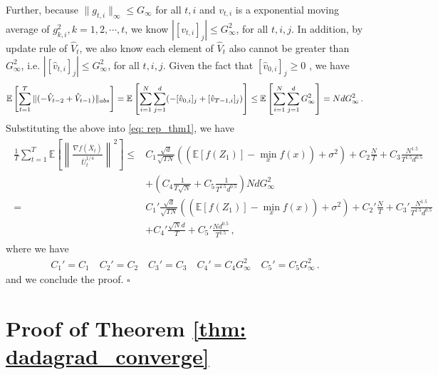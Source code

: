 \documentclass[11pt]{article}
\begin{document}
Further, because $\|g_{t,i}\|_{\infty} \leq G_{\infty}$ for all $t,i$ and $v_{t,i}$ is a exponential moving average of $g_{k,i}^2, k=1,2,\cdots,t$, we know $|[v_{t,i}]_j| \leq G^2_{\infty}$, for all $t,i,j$. In addition, by update rule of $\hat V_t$, we also know each element of $\hat V_{t}$ also cannot be greater than $G^2_{\infty}$, i.e. $|[\hat v_{t,i}]_j| \leq G^2_{\infty}$, for all $t,i,j$. 
Given the fact that $[\hat v_{0,i}]_j \geq 0$ , we have 
\begin{align}\notag
\mathbb E \left[ \sum_{t=1}^{T}   \|    (- \hat V_{t-2} + \hat V_{t-1} ) \|_{abs} \right]  = \mathbb E \left[   \sum_{i=1}^N \sum_{j=1}^d    (- [\hat v_{0,i}]_j + [\hat v_{T-1,i}]_j ) \right]  
\leq  \mathbb E \left[   \sum_{i=1}^N \sum_{j=1}^d  G_{\infty}^2   \right] =  Nd G_{\infty}^2 \, .
\end{align}
Substituting the above into \eqref{eq: rep_thm1}, we have 
\begin{align}\label{eq: sub_thm1}
\begin{split}
	 \frac{1}{T}\sum_{t=1}^T  \mathbb E \left [\left\|\frac{\nabla f( \overline X_{t})}{\overline U_{t}^{1/4}}\right\|^2  \right] 
	\leq  & C_1 \frac{\sqrt{d}}{\sqrt{TN}} \left(( \mathbb E  [f( Z_{1})]  -  \min_x  f(x)) +    \sigma^2 \right)  +  C_2 \frac{N}{T}  +  C_3 \frac{N^{1.5}}{T^{1.5}d^{0.5}} 
	 \\
    &+  \left(C_4 \frac{1}{T\sqrt{N}} +  C_5   \frac{1}{T^{1.5}d^{0.5}}\right)NdG_{\infty}^2 \\
    =  & C_1' \frac{\sqrt{d}}{\sqrt{TN}} \left(( \mathbb E  [f( Z_{1})]  -  \min_x  f(x)) +    \sigma^2 \right)  +  C_2' \frac{N}{T}  +  C_3' \frac{N^{1.5}}{T^{1.5}d^{0.5}} 
	 \\
    &+  C_4' \frac{\sqrt{N}d}{T} +  C_5'  \frac{Nd^{0.5}}{T^{1.5}}\,,
\end{split}
\end{align}
where we have 
\begin{align}
C_1' = C_1 \quad C_2' = C_2 \quad C_3' = C_3 \quad C_4' = C_4G_{\infty}^2 \quad C_5' = C_5 G_{\infty}^2 \, .
\end{align}
and we conclude the proof. \hfill $\square$



\clearpage


\section{Proof of Theorem \ref{thm: dadagrad_converge}} \label{app: proof_adagrad}
\end{document}
